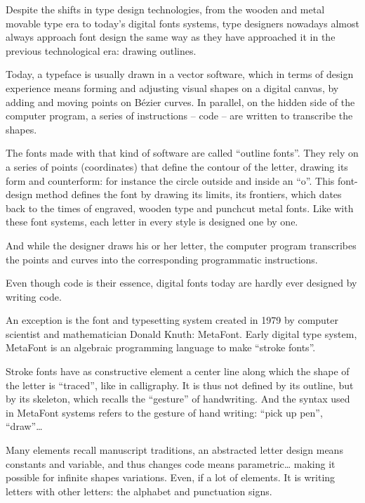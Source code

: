 \documentclass[danish,a2paper,22pt]{scrartcl}
\begin{document}
\vspace{0.5cm}
\begin{multicols*}{3}
\begin{spacing}{1.1}
\color{Black}
\metatext
\noindent
Despite the shifts in type design technologies, from the wooden and metal movable type era to today’s digital fonts systems, type designers nowadays almost always approach font design the same way as they have approached it in the previous technological era: drawing outlines.\par
Today, a typeface is usually drawn in a vector software, which in terms of design experience means forming and adjusting visual shapes on a digital canvas, by adding and moving points on Bézier curves. In parallel, on the hidden side of the computer program, a series of instructions – code – are written to transcribe the shapes.\par
The fonts made with that kind of software are called “outline fonts”. They rely on a series of points (coordinates) that define the contour of the letter, drawing its form and counterform: for instance the circle outside and inside an “o”. 
This font-design method defines the font by drawing its limits, its frontiers, which dates back to the times of engraved, wooden type and punch\-cut metal fonts. Like with these font systems, each letter in every style is designed one by one.\par
And while the designer draws his or her letter, the computer program transcribes the points and curves into the corresponding programmatic instructions.\par
\noindent
Even though code is their essence, digital fonts today are hardly ever designed by writing code.\par
An exception is the font and typesetting system created in 1979 by computer scientist and mathematician Donald Knuth: MetaFont. Early digital type system, MetaFont is an algebraic programming language to make “stroke fonts”.\par
Stroke fonts have as constructive element a center line along which the shape of the letter is “traced”, like in calligraphy. It is thus not defined by its outline, but by its skeleton, which recalls the “gesture” of handwriting. And the syntax used in MetaFont systems refers to the gesture of hand writing: “pick up pen”, “draw”\ldots \par
Many elements recall manu\-script traditions,  an abstracted letter design means constants and variable, and thus changes code means parametric… making it possible for infinite shapes variations. Even, if a lot of elements. It is writing letters with other letters: the alphabet and punc\-tuation signs.\par

\end{spacing}
\end{multicols*}
\end{document}
